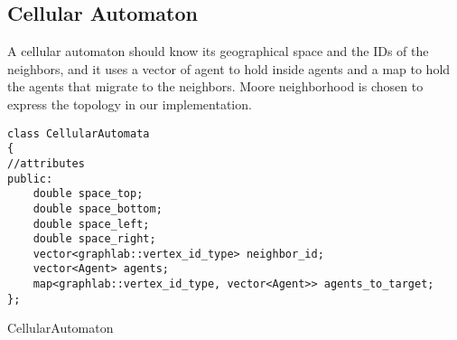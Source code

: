 \subsection{Cellular Automaton}

A cellular automaton should know its geographical space and the IDs of the neighbors, and it uses a vector of agent to hold inside agents and a map to hold the agents that migrate to the neighbors. Moore neighborhood is chosen to express the topology in our implementation. 

\begin{Listing}[H]
\begin{lstlisting}
class CellularAutomata
{
//attributes	
public:
	double space_top;
	double space_bottom;
	double space_left;
	double space_right;	
	vector<graphlab::vertex_id_type> neighbor_id;	
	vector<Agent> agents;
	map<graphlab::vertex_id_type, vector<Agent>> agents_to_target;
};
\end{lstlisting}
\caption{CellularAutomaton}
\label{lst:CellularAutomaton}
\end{Listing}

